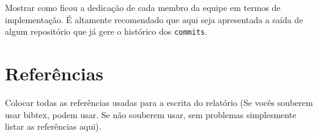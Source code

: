 \documentclass[12pt,a4paper]{article}
\begin{document}
Mostrar como ficou a dedicação de cada membro da equipe em termos de
implementação. É altamente recomendado que aqui seja apresentada a
saída de algum repositório que já gere o histórico dos
\texttt{commits}.

\section{Referências}

Colocar todas as referências usadas para a escrita do relatório (Se
vocês souberem usar bibtex, podem usar. Se não souberem usar, sem
problemas simplesmente listar as referências aqui).
\end{document}
